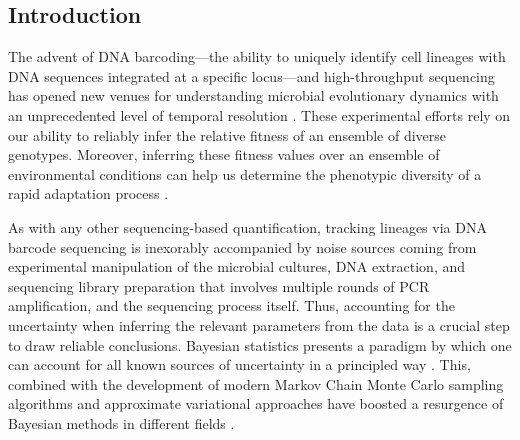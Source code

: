 \documentclass[
]{scrartcl}
\begin{document}
\begin{refsegment}

\hypertarget{introduction}{%
\section{Introduction}\label{introduction}}

The advent of DNA barcoding---the ability to uniquely identify cell
lineages with DNA sequences integrated at a specific locus---and
high-throughput sequencing has opened new venues for understanding
microbial evolutionary dynamics with an unprecedented level of temporal
resolution \autocite{levy2015,nguyenba2019a,ascensao2023}. These
experimental efforts rely on our ability to reliably infer the relative
fitness of an ensemble of diverse genotypes. Moreover, inferring these
fitness values over an ensemble of environmental conditions can help us
determine the phenotypic diversity of a rapid adaptation process
\autocite{kinsler2020}.

As with any other sequencing-based quantification, tracking lineages via
DNA barcode sequencing is inexorably accompanied by noise sources coming
from experimental manipulation of the microbial cultures, DNA
extraction, and sequencing library preparation that involves multiple
rounds of PCR amplification, and the sequencing process itself. Thus,
accounting for the uncertainty when inferring the relevant parameters
from the data is a crucial step to draw reliable conclusions. Bayesian
statistics presents a paradigm by which one can account for all known
sources of uncertainty in a principled way \autocite{eddy2004a}. This,
combined with the development of modern Markov Chain Monte Carlo
sampling algorithms \autocite{betancourt2017} and approximate
variational approaches \autocite{kucukelbir2016} have boosted a
resurgence of Bayesian methods in different fields
\autocite{efron2013a}.


\end{refsegment}
\end{document}
